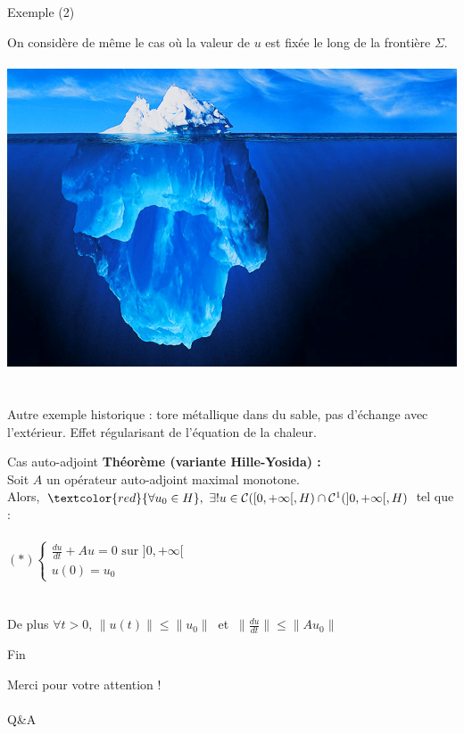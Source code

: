 \documentclass[10pt]{beamer}
\begin{document}
\begin{frame}{Exemple (2)}

On considère de même le cas où la valeur de $u$ est fixée le long de la frontière $\Sigma$. \\~\\


\includegraphics[scale=0.25]{iceberg.png}
 ~ \\~\\

Autre exemple historique : tore métallique dans du sable, pas d'échange avec l'extérieur. Effet régularisant de l'équation de la chaleur.
\end{frame}


\begin{frame}{Cas auto-adjoint}
\textbf{Théorème (variante Hille-Yosida) : \\}
Soit $A$ un opérateur auto-adjoint maximal monotone.\\
 Alors, $\textcolor{red}{\forall  u_0 \in H}, \ \exists ! u \in \mathcal{C}([0,+\infty[,H) \cap \mathcal{C}^1(]0,+\infty[,H)$ tel que : \\ ~ \\
$(*) \begin{cases}\displaystyle \frac{du}{dt} +Au = 0 \text{\ \ \ \ sur } ]0,+\infty[ \\ u(0)=u_0 \end{cases}$ \\ ~ \\ ~ \\
De plus  $\forall t > 0$, $\|u(t)\|\leq \|u_0\| \ $ et $\ \displaystyle \|\frac{du}{dt}\| \leq  \|Au_0\|$
\end{frame}


\begin{frame}{Fin}

\begin{center}
Merci pour votre attention ! \\~\\
Q\&A
\end{center}

\end{frame}
\end{document}
